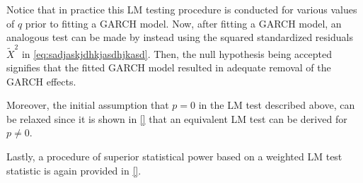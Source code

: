 Notice that in practice this LM testing procedure is conducted for various values of $q$ prior to fitting a GARCH model. Now, after fitting a GARCH model, an analogous test can be made by instead using the squared standardized residuals $\tilde{X}^{2}$ in \eqref{eq:sadjaskjdhkjasdhjkasd}. Then, the null hypothesis being accepted signifies that the fitted GARCH model resulted in adequate removal of the GARCH effects.

Moreover, the initial assumption that $p=0$ in the LM test described above, can be relaxed since it is shown in \ref{} that an equivalent LM test can be derived for $p\neq0$.%

Lastly, a procedure of superior statistical power based on a weighted LM test statistic is again provided in \ref{}.%



